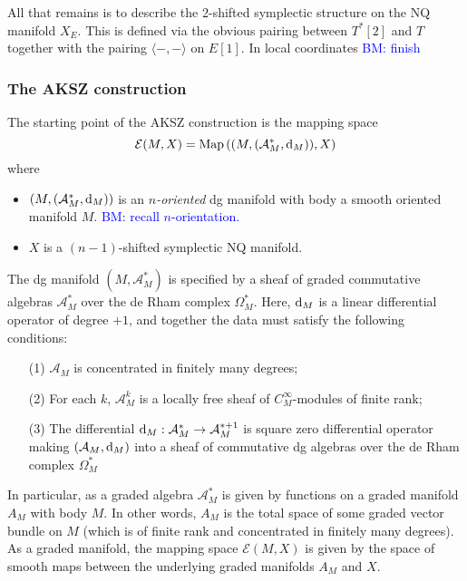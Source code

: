 \documentclass{article}
\newcommand{\cE}{\mathcal{E}}
\theoremstyle{definition}
\theoremstyle{remark}
\def\brian{\textcolor{blue}{BM: }\textcolor{blue}}
\begin{document}
All that remains is to describe the $2$-shifted symplectic structure on the NQ manifold $X_E$. 
This is defined via the obvious pairing between $T^*[2]$ and $T$ together with the pairing $\langle - ,- \rangle$ on $E[1]$.
In local coordinates \brian{finish}

\subsubsection{The AKSZ construction}

\def\sA{\mathcal{A}}
\def\d{{\rm d}}
\def\dbar{\Bar{\partial}}

The starting point of the AKSZ construction is the mapping space
\begin{equation}\label{eqn: map}
\cE (M, X) = {\rm Map}\left((M, (\sA^*_M, \d_M)), X\right)
\end{equation}
where 
\begin{itemize}
\item $(M, (\sA^*_M, \d_M))$ is an {\em $n$-oriented} dg manifold with body a smooth oriented manifold $M$. \brian{recall $n$-orientation.}
\item $X$ is a $(n-1)$-shifted symplectic NQ manifold. 
\end{itemize}

The dg manifold $(M, \sA^*_M)$ is specified by a sheaf of graded commutative algebras $\sA^*_M$ over the de Rham complex $\Omega^*_M$.
Here, $\d_M$ is a linear differential operator of degree $+1$, and together the data must satisfy the following conditions:
\begin{itemize}
\item[(1)] $\sA_M$ is concentrated in finitely many degrees;
\item[(2)] For each $k$, $\sA^k_M$ is a locally free sheaf of $C^\infty_M$-modules of finite rank;
\item[(3)] The differential $\d_M : \sA_M^* \to \sA_M^{*+1}$ is square zero differential operator making $(\sA_M , \d_M)$ into a sheaf of commutative dg algebras over the de Rham complex $\Omega^*_M$
\end{itemize}

In particular, as a graded algebra $\sA^*_M$ is given by functions on a graded manifold $A_M$ with body $M$.
In other words, $A_M$ is the total space of some graded vector bundle on $M$ (which is of finite rank and concentrated in finitely many degrees). 
As a graded manifold, the mapping space $\cE(M,X)$ is given by the space of smooth maps between the underlying graded manifolds $A_M$ and $X$. 
\end{document}
